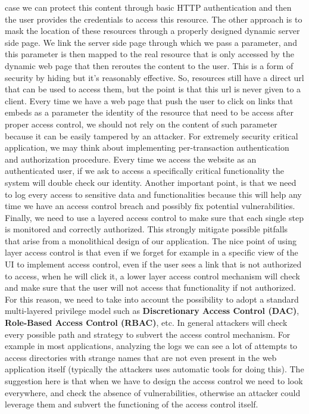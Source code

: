 case we can protect this content through basic HTTP authentication and then the user provides the credentials to access this resource. The other approach is to mask the location of these resources through a properly designed dynamic server side page. We link the server side page through which we pass a parameter, and this parameter is then mapped to the real resource that is only accessed by the dynamic web page that then reroutes the content to the user. This is a form of security by hiding but it's reasonably effective. So, resources still have a direct url that can be used to access them, but the point is that this url is never given to a client. Every time we have a web page that push the user to click on links that embeds as a parameter the identity of the resource that need to be access after proper access control, we should not rely on the content of such parameter because it can be easily tampered by an attacker. For extremely security critical application, we may think about implementing per-transaction authentication and authorization procedure. Every time we access the website as an authenticated user, if we ask to access a specifically critical functionality the system will double check our identity. Another important point, is that we need to log every access to sensitive data and functionalities because this will help any time we have an access control breach and possibly fix potential vulnerabilities. Finally, we need to use a layered access control to make sure that each single step is monitored and correctly authorized. This strongly mitigate possible pitfalls that arise from a monolithical design of our application. The nice point of using layer access control is that even if we forget for example in a specific view of the UI to implement access control, even if the user sees a link that is not authorized to access, when he will click it, a lower layer access control mechanism will check and make sure that the user will not access that functionality if not authorized. For this reason, we need to take into account the possibility to adopt a standard multi-layered privilege model such as \textbf{Discretionary Access Control (DAC)}, \textbf{Role-Based Access Control (RBAC)}, etc. In general attackers will check every possible path and strategy to subvert the access control mechanism. For example in most applications, analyzing the logs we can see a lot of attempts to access directories with strange names that are not even present in the web application itself (typically the attackers uses automatic tools for doing this). The suggestion here is that when we have to design the access control we need to look everywhere, and check the absence of vulnerabilities, otherwise an attacker could leverage them and subvert the functioning of the access control itself.

